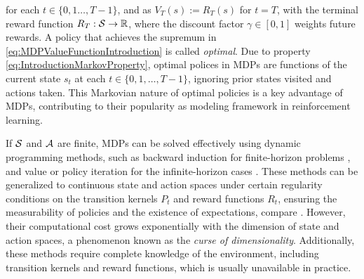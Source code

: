 \documentclass[
    a4paper,
    11pt,
    bibliography=totoc,
    listof=totoc,      
    headinclude=true,
    cleardoublepage=empty,
]{scrbook}
\theoremstyle{plain}
\theoremstyle{definition}
\theoremstyle{remark}
\newcommand{\SetR}{\mathbb R}
\newcommand{\SpaceS}{{\cal S}}
\newcommand{\SpaceA}{{\cal A}}
\begin{document}
for each $t\in\{0,1\dots,T-1\}$, and as $V_T(s):= R_T(s)$ for $t=T$, with the terminal reward function $R_T: 
\SpaceS\to\SetR$, where the 
discount factor $\gamma \in [0,1]$ weights future rewards. A policy that 
achieves the supremum in \eqref{eq:MDPValueFunctionIntroduction} is called \textit{optimal}. Due to property
\eqref{eq:IntroductionMarkovProperty}, optimal polices in MDPs are functions
of the current state $s_t$ at each $t \in \{0,1, 
\dots,T-1\}$, ignoring prior states visited and actions taken. This Markovian 
nature of optimal policies is a key advantage of MDPs, contributing to their 
popularity as modeling framework in reinforcement learning.

If $\SpaceS$ and $\SpaceA$ are finite, MDPs can be solved effectively using 
dynamic programming methods, such as backward induction for finite-horizon 
problems \cite[Section~4.5]{puterman2005_mdpdsdp}, and value or policy 
iteration for the infinite-horizon cases \cite[Sections~6.3~and~6.4]%
{puterman2005_mdpdsdp}. These methods can be generalized to continuous state 
and action spaces under certain regularity conditions on the transition 
kernels $P_t$ and reward functions $R_t$, ensuring the measurability of 
policies and the existence of expectations, compare \cite{hinderer2016_do}. 
However, their computational cost grows exponentially with the dimension of 
state and action spaces, a phenomenon known as the \textit{curse of 
dimensionality}. Additionally, these methods require complete knowledge of the 
environment, including transition kernels and reward functions, which is 
usually unavailable in practice.
\end{document}
